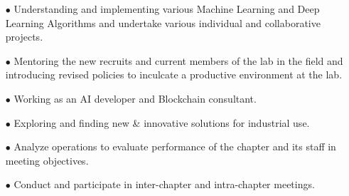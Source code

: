 \documentclass[10pt,a4paper,ragged2e]{altacv}
\begin{document}
\begin{itemize}
    \item [$\bullet$]Understanding and implementing various Machine Learning and Deep Learning Algorithms and undertake various individual and collaborative projects.
    \item [$\bullet$]Mentoring the new recruits and current members of the lab in the field and introducing revised policies to inculcate a productive environment at the lab.
\end{itemize}
\begin{itemize}
    \item [$\bullet$]Working as an AI developer and Blockchain consultant.
    \item [$\bullet$]Exploring and finding new \& innovative solutions for industrial use.
\end{itemize}
\begin{itemize}
    \item [$\bullet$]Analyze operations to evaluate performance of the chapter and its staff in meeting objectives.
    \item [$\bullet$]Conduct and participate in inter-chapter and intra-chapter meetings.
\end{itemize}
\begin{comment}
\cvevent{\textbf{Campus Ambassador}}{Zubi.io}{September 2019-present}{Chennai, India}
\begin{itemize}
    \item [$\bullet$]Handling the student outreach program by Zubi.io .
    \item [$\bullet$]Conducting and organizing events to spread the knowledge of\\* Blockchains among students.
    \item [$\bullet$]Promoting the use of blockchains in student-undertaken projects.
\end{itemize}
\end{comment}
\end{document}
